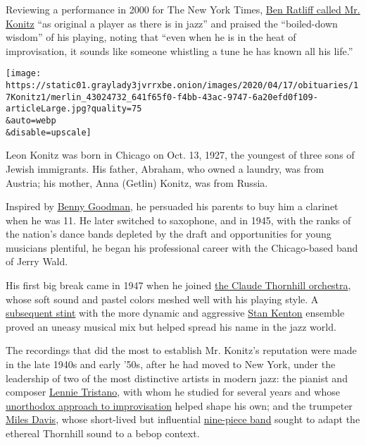 Reviewing a performance in 2000 for The New York Times,
\href{https://www.nytimes3xbfgragh.onion/2000/05/13/arts/jazz-review-writing-their-own-ticket-on-an-original-of-the-past.html}{Ben
Ratliff called Mr. Konitz} ``as original a player as there is in jazz''
and praised the ``boiled-down wisdom'' of his playing, noting that
``even when he is in the heat of improvisation, it sounds like someone
whistling a tune he has known all his life.''

\texttt{[image: https://static01.graylady3jvrrxbe.onion/images/2020/04/17/obituaries/17Konitz1/merlin\_43024732\_641f65f0-f4bb-43ac-9747-6a20efd0f109-articleLarge.jpg?quality=75\\\&auto=webp\\\&disable=upscale]}

Leon Konitz was born in Chicago on Oct. 13, 1927, the youngest of three
sons of Jewish immigrants. His father, Abraham, who owned a laundry, was
from Austria; his mother, Anna (Getlin) Konitz, was from Russia.

Inspired by
\href{https://www.nytimes3xbfgragh.onion/1986/06/14/obituaries/benny-goodman-king-of-swing-is-dead.html}{Benny
Goodman}, he persuaded his parents to buy him a clarinet when he was 11.
He later switched to saxophone, and in 1945, with the ranks of the
nation's dance bands depleted by the draft and opportunities for young
musicians plentiful, he began his professional career with the
Chicago-based band of Jerry Wald.

His first big break came in 1947 when he joined
\href{https://www.youtube.com/watch?v=oX05oHu63JE}{the Claude Thornhill
orchestra}, whose soft sound and pastel colors meshed well with his
playing style. A
\href{https://www.youtube.com/watch?v=YHxdZARIbSQ}{subsequent stint}
with the more dynamic and aggressive
\href{https://www.nytimes3xbfgragh.onion/1979/08/27/archives/stan-kenton-band-leader-dies-was-center-of-jazz-controversies-in-an.html}{Stan
Kenton} ensemble proved an uneasy musical mix but helped spread his name
in the jazz world.

The recordings that did the most to establish Mr. Konitz's reputation
were made in the late 1940s and early '50s, after he had moved to New
York, under the leadership of two of the most distinctive artists in
modern jazz: the pianist and composer
\href{https://www.nytimes3xbfgragh.onion/1978/11/20/archives/lennie-tristano-at-59-pianist-was-innovator-in-the-cool-jazz-era.html}{Lennie
Tristano}, with whom he studied for several years and whose
\href{https://www.youtube.com/watch?v=bznqGjyYuRk}{unorthodox approach
to improvisation} helped shape his own; and the trumpeter
\href{https://www.nytimes3xbfgragh.onion/1991/09/29/nyregion/miles-davis-trumpeter-dies-jazz-genius-65-defined-cool.html}{Miles
Davis}, whose short-lived but influential
\href{https://www.youtube.com/watch?v=tMPdP6-lrmc}{nine-piece band}
sought to adapt the ethereal Thornhill sound to a bebop context.

